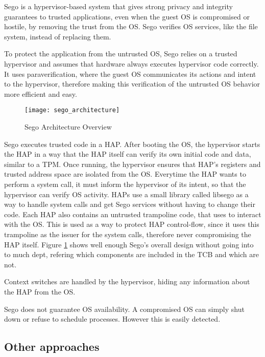 Sego \cite{segoPaper} is a hypervisor-based system that gives strong privacy and integrity guarantees to trusted applications, even when the guest OS is compromised or hostile, by removing the trust from the OS. Sego verifies OS services, like the file system, instead of replacing them.

To protect the application from the untrusted OS, Sego relies on a trusted hypervisor and assumes that hardware always executes hypervisor code correctly.
It uses paraverification, where the guest OS communicates its actions and intent to the hypervisor, therefore making this verification of the untrusted OS behavior more efficient and easy.

\begin{figure}[htbp]
	\centering
	{\texttt{[image: sego\_architecture]}}%
	\caption{Sego Architecture Overview}
	\label{fig:sego}
\end{figure}


Sego executes trusted code in a HAP. After booting the OS, the hypervisor starts the HAP in a way that the HAP itself can verify its own initial code and data, similar to a TPM. Once running, the hypervisor ensures that HAP's registers and trusted address space are isolated from the OS. 
Everytime the HAP wants to perform a system call, it must inform the hypervisor of its intent, so that the hypervisor can verify OS activity. HAPs use a small library called libsego as a way to handle system calls and get Sego services without having to change their code. 
Each HAP also contains an untrusted trampoline code, that uses to interact with the OS. This is used as a way to protect HAP control-flow, since it uses this trampoline as the issuer for the system calls, therefore never compromising the HAP itself. Figure \ref{fig:sego} shows well enough Sego's overall design without going into to much dept, refering which components are included in the TCB and which are not. 

Context switches are handled by the hypervisor, hiding any information about the HAP from the OS.

Sego does not guarantee OS availability. A compromised OS can simply shut down or refuse to schedule processes. However this is easily detected.




\subsection{Other approaches}
\label{ssec:tee_other_frameworks}

